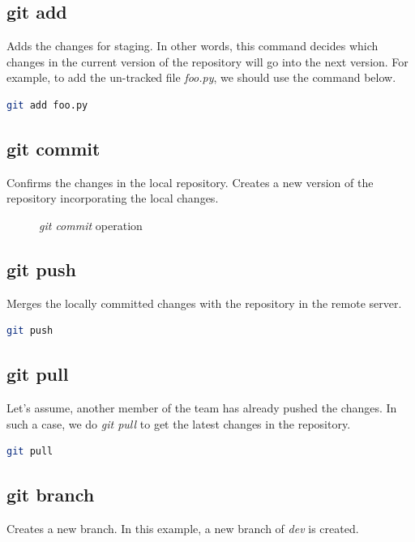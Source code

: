 \documentclass[letterpaper]{article}
\begin{document}
\subsection{git add}
Adds the changes for staging. In other words, this command decides which changes in the current version of the repository will go into the next version. For example, to add the un-tracked file \textit{foo.py}, we should use the command below. 
\begin{lstlisting}[language=Bash]
git add foo.py
\end{lstlisting}

\subsection{git commit}
Confirms the changes in the local repository. Creates a new version of the repository incorporating the local changes.

\begin{figure}[h]
    \centering
    \caption{\textit{git commit} operation}
  \end{figure}


\subsection{git push}
Merges the locally committed changes with the repository in the remote server.

\begin{lstlisting}[language=Bash]
git push
\end{lstlisting}


\subsection{git pull}
Let's assume, another member of the team has already pushed the changes. In such a case, we do \textit{git pull} to get the latest changes in the repository. 

\begin{lstlisting}[language=Bash]
git pull
\end{lstlisting}

\subsection{git branch}
Creates a new branch. In this example, a new branch of \textit{dev} is created. 
\end{document}
